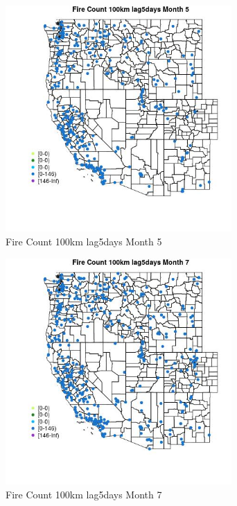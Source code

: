 \begin{figure} 
\centering  
\includegraphics[width=0.77\textwidth]{Code_Outputs/Report_ML_input_PM25_Step4_part_e_de_duplicated_aves_compiled_2019-05-18wNAs_MapObsMo5Fire_Count_100km_lag5days.jpg} 
\caption{\label{fig:Report_ML_input_PM25_Step4_part_e_de_duplicated_aves_compiled_2019-05-18wNAsMapObsMo5Fire_Count_100km_lag5days}Fire Count 100km lag5days Month 5} 
\end{figure} 
 

\clearpage 

\begin{figure} 
\centering  
\includegraphics[width=0.77\textwidth]{Code_Outputs/Report_ML_input_PM25_Step4_part_e_de_duplicated_aves_compiled_2019-05-18wNAs_MapObsMo7Fire_Count_100km_lag5days.jpg} 
\caption{\label{fig:Report_ML_input_PM25_Step4_part_e_de_duplicated_aves_compiled_2019-05-18wNAsMapObsMo7Fire_Count_100km_lag5days}Fire Count 100km lag5days Month 7} 
\end{figure} 
 

